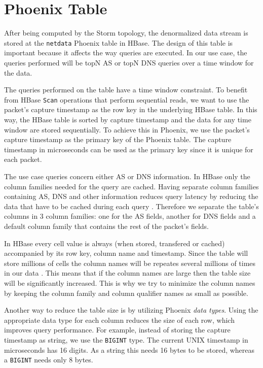 \section{Phoenix Table}\label{section:system_phoenix_table}

After being computed by the Storm topology, the denormalized data stream is stored at the \texttt{netdata} Phoenix table in HBase. The design of this table is important because it affects the way queries are executed. In our use case, the queries performed will be topN AS or topN DNS queries over a time window for the data. 

The queries performed on the table have a time window constraint. To benefit from HBase \texttt{Scan} operations that perform sequential reads, we want to use the packet's capture timestamp as the row key in the underlying HBase table. In this way, the HBase table is sorted by capture timestamp and the data for any time window are stored sequentially. To achieve this in Phoenix, we use the packet's capture timestamp as the primary key of the Phoenix table. The capture timestamp in microseconds can be used as the primary key since it is unique for each packet.

The use case queries concern either AS or DNS information. In HBase only the column families needed for the query are cached. Having separate column families containing AS, DNS and other information reduces query latency by reducing the data that have to be cached during each query \cite{hbase_reference}. Therefore we separate the table's columns in 3 column families: one for the AS fields, another for DNS fields and a default column family that contains the rest of the packet's fields.

In HBase every cell value is always (when stored, transfered or cached) accompanied by its row key, column name and timestamp. Since the table will store millions of cells the column names will be repeates several millions of times in our data \cite{hbase_reference}. This means that if the column names are large then the table size will be significantly increased. This is why we try to minimize the column names by keeping the column family and column qualifier names as small as possible.

Another way to reduce the table size is by utilizing Phoenix \emph{data types}. Using the appropriate data type for each column reduces the size of each row, which improves query performance. For example, instead of storing the capture timestamp as string, we use the \texttt{BIGINT} type. The current UNIX timestamp in microseconds has 16 digits. As a string this needs 16 bytes to be stored, whereas a \texttt{BIGINT} needs only 8 bytes.

